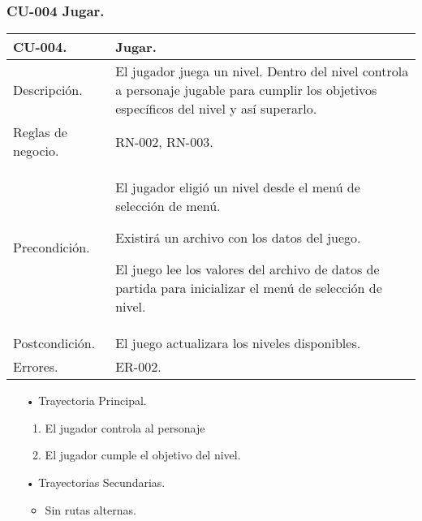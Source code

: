 \subsubsection{CU-004 Jugar.} \label{CU:04}
\begin{longtable}[c]{ | m{5cm} | m{10cm}|} 
		\hline
		\rowcolor{cyan}CU-004. & Jugar. \\ 
		\hline
		Descripción. & El jugador juega un nivel. Dentro del nivel controla a personaje jugable para cumplir los objetivos específicos del nivel y así superarlo.\\ 
		\hline
		Reglas de negocio. & RN-002, RN-003.\\ 
		\hline
		Precondición. & El jugador eligió un nivel desde el menú de selección de menú.
		\par
		Existirá un archivo con los datos del juego.
		\par
		El juego lee los valores del archivo de datos de partida para inicializar el menú de selección de nivel.\\
		\hline
		Postcondición. & El juego actualizara los niveles disponibles.\\
		\hline
		Errores. & ER-002.\\
		\hline
\end{longtable}
\begin{itemize}
	\item[•] Trayectoria Principal.
		\begin{enumerate}
			\item El jugador controla al personaje
			\item El jugador cumple el objetivo del nivel.

		\end{enumerate}
	\item[•] Trayectorias Secundarias.
		\begin{itemize}
			\item Sin rutas alternas.
		\end{itemize}
\end{itemize}
